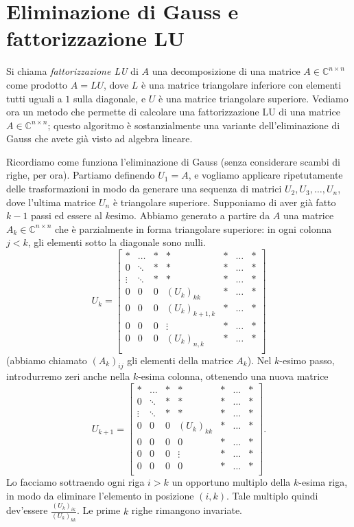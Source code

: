 \documentclass[a4paper]{report}
\theoremstyle{definiton}
\theoremstyle{remark}
\begin{document}
\section{Eliminazione di Gauss e fattorizzazione LU}

Si chiama \emph{fattorizzazione LU} di $A$ una decomposizione di una matrice $A\in\mathbb{C}^{n\times n}$ come prodotto $A=LU$, dove $L$ è una matrice triangolare inferiore con elementi tutti uguali a $1$ sulla diagonale, e $U$ è una matrice triangolare superiore. Vediamo ora un metodo che permette di calcolare una fattorizzazione LU di una matrice $A \in \mathbb{C}^{n\times n}$; questo algoritmo è sostanzialmente una variante dell'eliminazione di Gauss che avete già visto ad algebra lineare.

Ricordiamo come funziona l'eliminazione di Gauss (senza considerare scambi di righe, per ora). Partiamo definendo $U_1 = A$, e vogliamo applicare ripetutamente delle trasformazioni in modo da generare una sequenza di matrici $U_2, U_3, \dots, U_n$, dove l'ultima matrice $U_n$ è triangolare superiore. Supponiamo di aver già fatto $k-1$ passi ed essere al $k$esimo. Abbiamo generato a partire da $A$ una matrice $A_k \in\mathbb{C}^{n\times n}$ che è parzialmente in forma triangolare superiore: in ogni colonna $j<k$, gli elementi sotto la diagonale sono nulli. 
\[
U_k = \begin{bmatrix}
    \ast & \dots & \ast & \ast & \ast & \dots & \ast\\
    0 & \ddots & \ast& \ast & \ast& \dots & \ast\\
    \vdots & \ddots & \ast & \ast& \ast & \dots & \ast\\
    0& 0  &0 & (U_k)_{kk} & \ast & \dots & \ast\\
    0& 0  &0 & (U_k)_{k+1,k} & \ast & \dots & \ast\\
    0& 0  &0 & \vdots & \ast & \dots & \ast\\
    0& 0  &0 & (U_k)_{n,k} & \ast & \dots & \ast\\
\end{bmatrix}
\]
(abbiamo chiamato $(A_k)_{ij}$ gli elementi della matrice $A_k$).
Nel $k$-esimo passo, introdurremo zeri anche nella $k$-esima colonna, ottenendo una nuova matrice 
\[
U_{k+1} = \begin{bmatrix}
    \ast & \dots & \ast & \ast & \ast & \dots & \ast\\
    0 & \ddots & \ast& \ast & \ast& \dots & \ast\\
    \vdots & \ddots & \ast & \ast& \ast & \dots & \ast\\
    0& 0  &0 & (U_k)_{kk} & \ast & \dots & \ast\\
    0& 0  &0 & 0 & \ast & \dots & \ast\\
    0& 0  &0 & \vdots & \ast & \dots & \ast\\
    0& 0  &0 & 0 & \ast & \dots & \ast\\
\end{bmatrix}.
\]
Lo facciamo sottraendo ogni riga $i>k$ un opportuno multiplo della $k$-esima riga, in modo da eliminare l'elemento in posizione $(i,k)$. Tale multiplo quindi dev'essere $\frac{(U_k)_{ik}}{(U_k)_{kk}}$. Le prime $k$ righe rimangono invariate.
\end{document}
